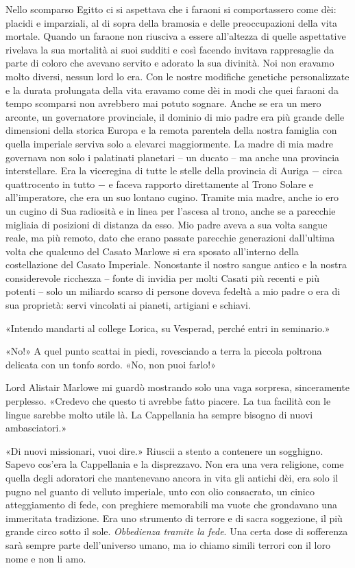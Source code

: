 Nello scomparso Egitto ci si aspettava che i faraoni si comportassero
come dèi: placidi e imparziali, al di sopra della bramosia e delle
preoccupazioni della vita mortale. Quando un faraone non riusciva a
essere all'altezza di quelle aspettative rivelava la sua mortalità ai
suoi sudditi e così facendo invitava rappresaglie da parte di coloro che
avevano servito e adorato la sua divinità. Noi non eravamo molto
diversi, nessun lord lo era. Con le nostre modifiche genetiche
personalizzate e la durata prolungata della vita eravamo come dèi in
modi che quei faraoni da tempo scomparsi non avrebbero mai potuto
sognare. Anche se era un mero arconte, un governatore {provinciale}, il
dominio di mio padre era più grande delle dimensioni della storica
Europa e la remota parentela della nostra famiglia con quella imperiale
serviva solo a elevarci maggiormente. La madre di mia madre governava
non solo i palatinati planetari -- un ducato -- ma anche una provincia
interstellare. Era la viceregina di tutte le stelle della provincia di
Auriga − circa quattrocento in tutto − e faceva rapporto direttamente al
Trono Solare e all'imperatore, che era un suo lontano cugino. Tramite
mia madre, anche io ero un cugino di Sua radiosità e in linea per
l'ascesa al trono, anche se a parecchie migliaia di posizioni di
distanza da esso. Mio padre aveva a sua volta sangue reale, ma più
remoto, dato che erano passate parecchie generazioni dall'ultima volta
che qualcuno del Casato Marlowe si era sposato all'interno della
costellazione del Casato Imperiale. Nonostante il nostro sangue antico e
la nostra considerevole ricchezza -- fonte di invidia per molti Casati
più recenti e più potenti -- solo un miliardo scarso di persone doveva
fedeltà a mio padre o era di sua proprietà: servi vincolati ai pianeti,
artigiani e schiavi.

«Intendo mandarti al college Lorica, su Vesperad, perché entri in
seminario.»

«No!» A quel punto scattai in piedi, rovesciando a terra la piccola
poltrona delicata con un tonfo sordo. «No, non puoi farlo!»

Lord Alistair Marlowe mi guardò mostrando solo una vaga sorpresa,
sinceramente perplesso. «Credevo che questo ti avrebbe fatto piacere. La
tua facilità con le lingue sarebbe molto utile là. La Cappellania ha
sempre bisogno di nuovi ambasciatori.»

«Di nuovi missionari, vuoi dire.» Riuscii a stento a contenere un
sogghigno. Sapevo cos'era la Cappellania e la disprezzavo. Non era una
vera religione, come quella degli adoratori che mantenevano ancora in
vita gli antichi dèi, era solo il pugno nel guanto di velluto imperiale,
unto con olio consacrato, un cinico atteggiamento di fede, con preghiere
memorabili ma vuote che grondavano una immeritata tradizione. Era uno
strumento di terrore e di sacra soggezione, il più grande circo sotto il
sole. \emph{Obbedienza tramite la fede}. Una certa dose di sofferenza
sarà sempre parte dell'universo umano, ma io chiamo simili terrori con
il loro nome e non li amo.

